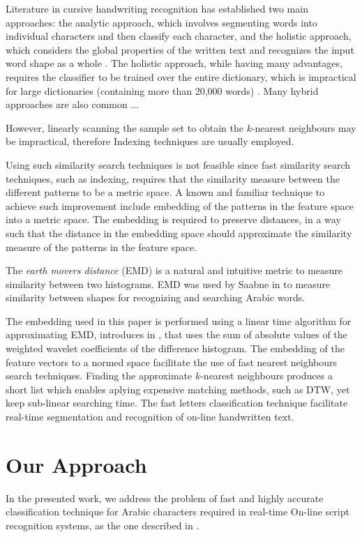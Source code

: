 \documentclass[10pt, conference, compsocconf]{IEEEtran}
\theoremstyle{definition}
\begin{document}
Literature in cursive handwriting recognition has established two main approaches: the analytic approach, which involves segmenting words into individual characters and then classify each character\cite{abdulla2008off, sari2002off, Dinges2011}, and the holistic approach, which considers the global properties of the written text and recognizes the input word shape as a whole \cite{biadsy2011segmentation, saabni2009hierarchical}. 
The holistic approach, while having many advantages, requires the classifier to be trained over the entire dictionary, which is impractical for large dictionaries (containing more than 20,000 words) \cite{elanwar2012unconstrained}.
Many hybrid approaches are also common ...
 
 
However, linearly scanning the sample set to obtain the $k$-nearest neighbours may be impractical, therefore Indexing techniques are usually employed.

Using such similarity search techniques is not feasible since fast similarity search techniques, such as indexing, requires that the similarity measure between the different patterns to be a metric space.
A known and familiar technique to achieve such improvement include embedding of the patterns in the feature space into a metric space. The embedding is required to preserve distances, in a way such that the distance in the embedding space should approximate the similarity measure of the patterns in the feature space.

The \emph{earth movers distance} (EMD) is a natural and intuitive metric to measure similarity between two histograms.
EMD was used by Saabne in \cite{saabni2013efficient} to measure similarity between shapes for recognizing and searching Arabic words. 

{The embedding used in this paper is performed using a linear time algorithm for approximating EMD, introduces in \cite{shirdhonkar2008approximate}, that uses the sum of absolute values of the weighted wavelet coefficients of the difference histogram. 
The embedding of the feature vectors to a normed space facilitate the use of fast nearest neighbours search techniques.
Finding the approximate $k$-nearest neighbours produces a short list which enables aplying expensive matching methods, such as DTW, yet keep sub-linear searching time.
The fast letters classification technique facilitate real-time segmentation and recognition of on-line handwritten text.}

\section{Our Approach}
\label{sec:approach}
In the presented work, we address the problem of fast and highly accurate classification technique for Arabic characters required in real-time On-line script recognition systems, as the one described in \cite{kour2014real}.
\end{document}
